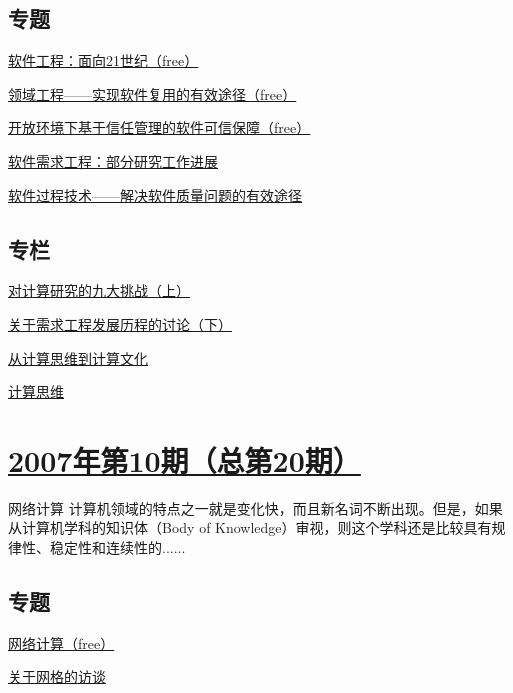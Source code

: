 \documentclass[a4paper]{article}
\begin{document}
\subsection{专题}
\href{http://history.ccf.org.cn/resources/1190201776262/2010/04/15/021014.pdf}{软件工程：面向21世纪（free）}

\href{http://history.ccf.org.cn/resources/1190201776262/2010/04/15/021017.pdf}{领域工程——实现软件复用的有效途径（free）}

\href{http://history.ccf.org.cn/resources/1190201776262/2010/04/15/021026.pdf}{开放环境下基于信任管理的软件可信保障（free）}

\href{http://history.ccf.org.cn/resources/1190201776262/2010/04/15/021035.pdf}{软件需求工程：部分研究工作进展}

\href{http://history.ccf.org.cn/resources/1190201776262/2010/04/15/021044.pdf}{软件过程技术——解决软件质量问题的有效途径}

\subsection{专栏}
\href{http://history.ccf.org.cn/resources/1190201776262/2010/04/15/021056.pdf}{对计算研究的九大挑战（上）}

\href{http://history.ccf.org.cn/resources/1190201776262/2010/04/15/021066.pdf}{关于需求工程发展历程的讨论（下）}

\href{http://history.ccf.org.cn/resources/1190201776262/2010/04/15/021078.pdf}{从计算思维到计算文化}

\href{http://history.ccf.org.cn/resources/1190201776262/2010/04/15/021083.pdf}{计算思维}


\section{\href{http://history.ccf.org.cn/sites/ccf/jsjtbbd.jsp?contentId=2542567628977}{\textbf{2007年第10期（总第20期）}}}
网络计算 计算机领域的特点之一就是变化快，而且新名词不断出现。但是，如果从计算机学科的知识体（Body of Knowledge）审视，则这个学科还是比较具有规律性、稳定性和连续性的......
\subsection{专题}
\href{http://history.ccf.org.cn/resources/1190201776262/2010/04/15/020014.pdf}{网络计算（free）}

\href{http://history.ccf.org.cn/resources/1190201776262/2010/04/15/020016.pdf}{关于网格的访谈}
\end{document}
